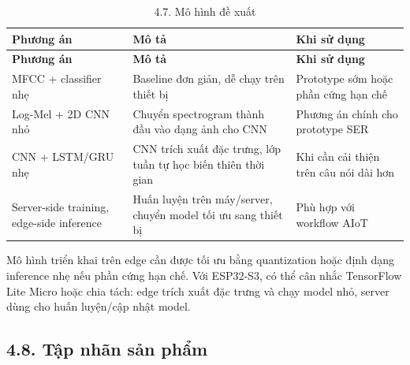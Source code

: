 \documentclass[12pt,a4paper]{article}
\begin{document}
\begin{center}
\begin{longtable}{|P{0.25\textwidth}|P{0.32\textwidth}|P{0.33\textwidth}|}
\caption{4.7. Mô hình đề xuất}\\
\hline
\textbf{Phương án} & \textbf{Mô tả} & \textbf{Khi sử dụng} \\
\hline
\endfirsthead
\hline
\textbf{Phương án} & \textbf{Mô tả} & \textbf{Khi sử dụng} \\
\hline
\endhead
MFCC + classifier nhẹ & Baseline đơn giản, dễ chạy trên thiết bị & Prototype sớm hoặc phần cứng hạn chế \\
\hline
Log-Mel + 2D CNN nhỏ & Chuyển spectrogram thành đầu vào dạng ảnh cho CNN & Phương án chính cho prototype SER \\
\hline
CNN + LSTM/GRU nhẹ & CNN trích xuất đặc trưng, lớp tuần tự học biến thiên thời gian & Khi cần cải thiện trên câu nói dài hơn \\
\hline
Server-side training, edge-side inference & Huấn luyện trên máy/server, chuyển model tối ưu sang thiết bị & Phù hợp với workflow AIoT \\
\hline
\end{longtable}
\end{center}

Mô hình triển khai trên edge cần được tối ưu bằng quantization hoặc định dạng inference nhẹ nếu phần cứng hạn chế. Với ESP32-S3, có thể cân nhắc TensorFlow Lite Micro hoặc chia tách: edge trích xuất đặc trưng và chạy model nhỏ, server dùng cho huấn luyện/cập nhật model.


\subsection*{4.8. Tập nhãn sản phẩm}
\end{document}
